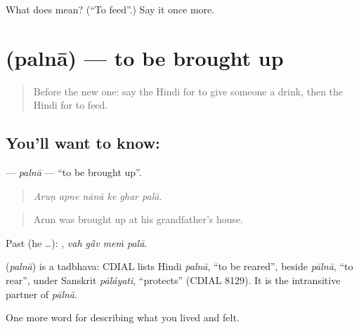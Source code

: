 \begin{tcolorbox}[breakable,colback=teal!4,colframe=teal!35!black,title={Before you move on}]
What does  mean? (\textquotedblleft{}To feed\textquotedblright{}.) Say it once more.
\end{tcolorbox}
\section[\texorpdfstring{\hi{पलना} (palnā)}{पलना (palnā)}]{ (palnā) — to be brought up}

\label{lesson:HI-C498-palnaintr}



\begin{quote}
Before the new one: say the Hindi for to give someone a drink, then the Hindi for to feed.
\end{quote}

\subsection*{You'll want to know: }
\textbf{} — \emph{palnā} — \textquotedblleft{}to be brought up\textquotedblright{}.

\begin{quote}
     
\end{quote}

\begin{quote}
\emph{Aruṇ apne nānā ke ghar palā.}
\end{quote}

\begin{quote}
Arun was brought up at his grandfather's house.
\end{quote}

Past (he …):    , \emph{vah gā̃v meṁ palā}.

\begin{cousinweb}
\textbf{} (\emph{palnā}) is a tadbhava: CDIAL lists Hindi \emph{palnā}, \textquotedblleft{}to be reared\textquotedblright{}, beside \emph{pālnā}, \textquotedblleft{}to rear\textquotedblright{}, under Sanskrit \emph{pāláyati}, \textquotedblleft{}protects\textquotedblright{} (CDIAL 8129). It is the intransitive partner of \emph{pālnā}.
\end{cousinweb}

\begin{grammarlens}[title={What you've built}]
One more word for describing what you lived and felt.
\end{grammarlens}

